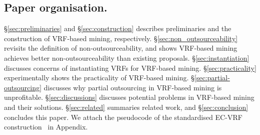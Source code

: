 \subsection{Paper organisation.}
\S\ref{sec:preliminaries} and \S\ref{sec:construction} describes preliminaries and the construction of VRF-based mining, respectively.
\S\ref{sec:non_outsourceability} revisits the definition of non-outsourceability, and shows VRF-based mining achieves better non-outsourceability than existing proposals.
\S\ref{sec:instantiation} discusses concerns of instantiating VRFs for VRF-based mining.
\S\ref{sec:practicality} experimentally shows the practicality of VRF-based mining.
\S\ref{sec:partial-outsourcing} discusses why partial outsourcing in VRF-based mining is unprofitable.
\S\ref{sec:discussions} discusses potential problems in VRF-based mining and their solutions.
\S\ref{sec:related} summaries related work, and \S\ref{sec:conclusion} concludes this paper.
We attach the pseudocode of the standardised EC-VRF construction~\cite{goldberg2017draft} in Appendix.
